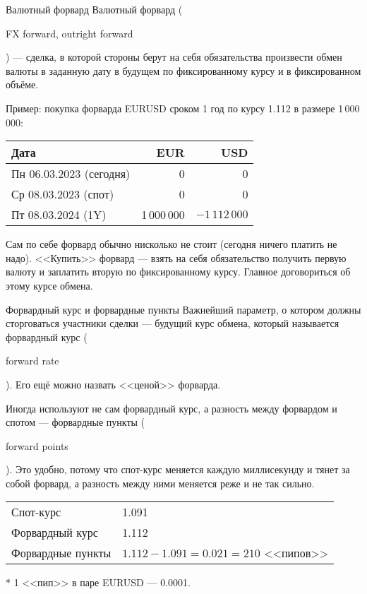 \documentclass{beamer}
\newcommand{\en}[1]{\begin{otherlanguage}{english}#1\end{otherlanguage}}
\begin{document}
\begin{frame}{Валютный форвард}
\justify
\alert{Валютный форвард} (\en{FX forward, outright forward}) --- сделка, в которой стороны берут 
на себя обязательства произвести обмен валюты в заданную дату в будущем по 
фиксированному курсу и в фиксированном объёме. 

\justify
Пример: покупка форварда EURUSD сроком 1 год по курсу 1.112 в размере 1\,000\,000:

\centering
\begin{tabular}{l|r|r}
Дата                          & EUR & USD \\ \hline
Пн 06.03.2023 (сегодня)  & 0   & 0   \\
Ср 08.03.2023 (спот) & 0   & 0   \\
Пт 08.03.2024 (1Y)   & 1\,000\,000 & $-1\,112\,000$
\end{tabular}

\justify
Сам по себе форвард обычно нисколько не стоит (сегодня ничего платить не надо). <<Купить>> форвард --- взять на себя обязательство получить первую валюту и заплатить вторую по фиксированному курсу. Главное договориться об этому курсе обмена.
\end{frame}



\begin{frame}{Форвардный курс и форвардные пункты}
\justify
Важнейший параметр, о котором должны сторговаться участники сделки --- будущий курс обмена, который называется \alert{форвардный курс} (\en{forward rate}). Его ещё можно назвать <<ценой>> форварда.

\justify
Иногда используют не сам форвардный курс, а разность между форвардом и спотом --- \alert{форвардные пункты} (\en{forward points}). Это удобно, потому что спот-курс меняется каждую миллисекунду и тянет за собой форвард, а разность между ними меняется реже и не так сильно.

\vspace{\baselineskip}
\centering
\begin{tabular}{l|l}
Спот-курс & 1.091 \\
Форвардный курс & 1.112 \\
\hline
Форвардные пункты & $1.112 - 1.091 = 0.021 = 210$ <<пипов>>
\end{tabular}

\justify
* 1 <<пип>> в паре EURUSD --- 0.0001.
\end{frame}
\end{document}
